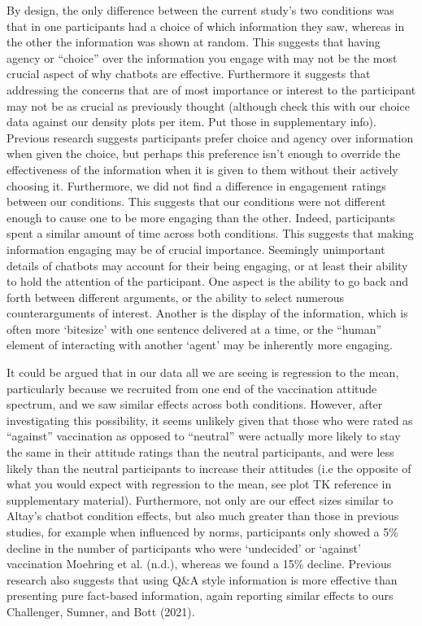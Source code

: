 \documentclass[
  english,
  ,jou,floatsintext]{apa6}
\begin{document}
By design, the only difference between the current study's two conditions was that in one participants had a choice of which information they saw, whereas in the other the information was shown at random. This suggests that having agency or ``choice'' over the information you engage with may not be the most crucial aspect of why chatbots are effective. Furthermore it suggests that addressing the concerns that are of most importance or interest to the participant may not be as crucial as previously thought (although check this with our choice data against our density plots per item. Put those in supplementary info). Previous research suggests participants prefer choice and agency over information when given the choice, but perhaps this preference isn't enough to override the effectiveness of the information when it is given to them without their actively choosing it. Furthermore, we did not find a difference in engagement ratings between our conditions. This suggests that our conditions were not different enough to cause one to be more engaging than the other. Indeed, participants spent a similar amount of time across both conditions. This suggests that making information engaging may be of crucial importance. Seemingly unimportant details of chatbots may account for their being engaging, or at least their ability to hold the attention of the participant. One aspect is the ability to go back and forth between different arguments, or the ability to select numerous counterarguments of interest. Another is the display of the information, which is often more `bitesize' with one sentence delivered at a time, or the ``human'' element of interacting with another `agent' may be inherently more engaging.

It could be argued that in our data all we are seeing is regression to the mean, particularly because we recruited from one end of the vaccination attitude spectrum, and we saw similar effects across both conditions. However, after investigating this possibility, it seems unlikely given that those who were rated as ``against'' vaccination as opposed to ``neutral'' were actually more likely to stay the same in their attitude ratings than the neutral participants, and were less likely than the neutral participants to increase their attitudes (i.e the opposite of what you would expect with regression to the mean, see plot TK reference in supplementary material). Furthermore, not only are our effect sizes similar to Altay's chatbot condition effects, but also much greater than those in previous studies, for example when influenced by norms, participants only showed a 5\% decline in the number of participants who were `undecided' or `against' vaccination Moehring et al. (n.d.), whereas we found a 15\% decline. Previous research also suggests that using Q\&A style information is more effective than presenting pure fact-based information, again reporting similar effects to ours Challenger, Sumner, and Bott (2021).
\end{document}
